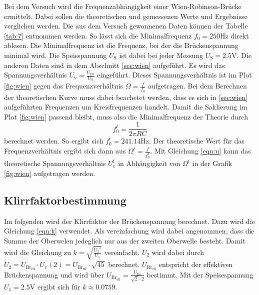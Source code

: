 Bei dem Versuch wird die Frequenzabhängigkeit einer Wien-Robinson-Brücke ermittelt. Dabei sollen die theoretischen und gemessenen Werte und Ergebnisse verglichen werden.
Die aus dem Versuch gewonnenen Daten können der Tabelle \ref{tab:7} entnommen werden. So lässt sich die Minimalfrequenz
$f_0=250\si{\hertz}$ direkt ablesen. Die Minimalfrequenz ist die Frequenz, bei der die Brückenspannung minimal wird. Die Speisspannung 
$U_{\text{S}}$ ist dabei bei jeder Messung $U_{\text{S}}=2.5 \si{\volt}$. Die anderen Daten sind in dem Abschnitt \ref{sec:wien} aufgeführt.
Es wird das Spannungsverhältnis $U_{\text{v}}=\frac{U_{\text{Br}}}{U_{\text{S}}}$ eingeführt. Dieses Spannungsverhältnis ist im Plot \ref{fig:wien}
gegen das Frequenzverhältnis $\Omega=\frac{f}{f_0}$ aufgetragen. Bei dem Berechnen der theoretischen Kurve muss dabei beachetet werden,
dass es sich in \ref{sec:wien} aufgeführten Frequenzen um Kreisfrequenzen handelt. Damit die Saklierung im Plot \ref{fig:wien} passend bleibt,
muss also die Minimalfrequenz der Theorie durch 
\begin{equation}
    f_{0}^{t}=\frac{1}{2\pi RC}
\end{equation} 
berechnet werden. So ergibt sich $f_{0}^{t}=241.14\si{\hertz}$. Der theoretische Wert für das Frequenzverhältnis ergibt sich dann aus $\Omega^{t}=\frac{f}{f_{0}^{t}}$.
Mit Gleichung \eqref{eqn:u} kann das theoretische Spannungsverhältnis $U_{\text{v}}^{t}$ in Abhängigkeit von $\Omega^{t}$ in der Grafik
\ref{fig:wien} aufgetragen werden.

\subsection{Klirrfaktorbestimmung} %
\label{sub:Klirrfaktorbestimmung}

Im folgenden wird der Klirrfaktor der Brückenspannung berechnet. Dazu wird die Gleichung \eqref{eqn:k} verwendet. 
Als vereinfachung wird dabei angenommen, dass die Summe der Oberwelen jedeglich nur aus der zweiten Oberwelle besteht.
Damit wird die Gleichung zu $k = \sqrt{\frac{ {U_2}^2}{U_1}}$ vereinfacht. $U_2$ wird dabei durch $U_2=U_{\text{Br}_\text{eff}}\cdot U_{\text{v}}(2)=U_{\text{Br}_\text{eff}}\cdot \sqrt{45}$ berechnet.
$U_{\text{Br}_\text{eff}}$ entspricht der effektiven Brückenspannung und wird über $U_{\text{Br}_\text{eff}}=\frac{U_{\text{Br}}}{\sqrt{2}\cdot2}$ bestimmt.
Mit der Speisespannung $U_1=2.5\si{\volt}$ ergibt sich für $k\approx 0.0759$.
 




%
